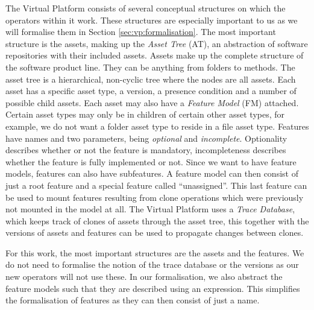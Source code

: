 The Virtual Platform consists of several conceptual structures on which the
operators within it work. These structures are especially important to us as we
will formalise them in Section \ref{sec:vp:formalisation}. The most important
structure is the assets, making up the \emph{Asset Tree} (AT), an abstraction
of software repositories with their included assets. Assets make up
the complete structure of the software product line. They can be anything from
folders to methods. The asset tree is a hierarchical, non-cyclic tree where the 
nodes are all assets. Each asset has a specific asset type, a version, a presence
condition and a number of possible child assets. Each asset may also have a
\emph{Feature Model} (FM) attached. 
Certain asset types may only be in children of certain other asset types, for
example, we do not want a folder asset type to reside in a file asset type.
Features have names and two parameters, being \emph{optional} and
\emph{incomplete}. Optionality describes whether or not the feature is
mandatory, incompleteness describes whether the feature is fully implemented or
not. Since we want to have feature models, features can also have subfeatures. 
A feature model can then consist of just a root feature and a special
feature called ``unassigned''. This last feature can be used to mount features
resulting from clone operations which were previously not mounted in the model
at all. The Virtual Platform uses a \emph{Trace Database}, which keeps track of
clones of assets through the asset tree, this together with the versions of assets
and features can be used to propagate changes between clones.

For this work, the most important structures are the assets and the features.
We do not need to formalise the notion of the trace database or the versions as
our new operators will not use these. In our formalisation, we also abstract the
feature models such that they are described using an expression. This
simplifies the formalisation of features as they can then consist of just a
name.

